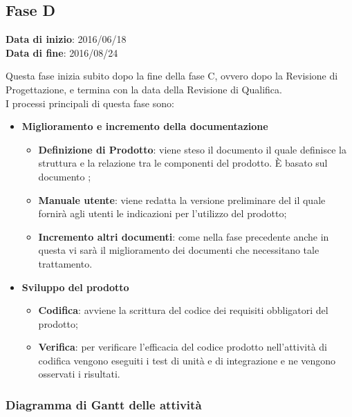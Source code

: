 	\subsection{Fase D}
	\begin{center}
		\textbf{Data di inizio}: 2016/06/18 \\
		\textbf{Data di fine}: 2016/08/24 \\
	\end{center}
	Questa fase inizia subito dopo la fine della fase C, ovvero dopo la Revisione di Progettazione, e termina con la data della Revisione di Qualifica. \\
	I processi principali di questa fase sono: 
		\begin{itemize}
			\item \textbf{Miglioramento e incremento della documentazione}
			\att
			\begin{itemize}
				\item \textbf{Definizione di Prodotto}: viene steso il documento \DPdocRQ il quale definisce la struttura e la relazione tra le componenti del prodotto. È basato sul documento \STdocRQ;
				\item \textbf{Manuale utente}: viene redatta la versione preliminare del \MUdocRQ il quale fornirà agli utenti le indicazioni per l'utilizzo del prodotto;
				\item \textbf{Incremento altri documenti}: come nella fase precedente anche in questa vi sarà il miglioramento dei documenti che necessitano tale trattamento.
			\end{itemize}
			\item \textbf{Sviluppo del prodotto}
			\att
			\begin{itemize}
				\item \textbf{Codifica}: avviene la scrittura del codice dei requisiti obbligatori del prodotto;
				\item \textbf{Verifica}: per verificare l'efficacia del codice prodotto nell'attività di codifica vengono eseguiti i test di unità e di integrazione e ne vengono osservati i risultati. 
			\end{itemize}
		\end{itemize}
		\subsubsection{Diagramma di Gantt delle attività}
		
